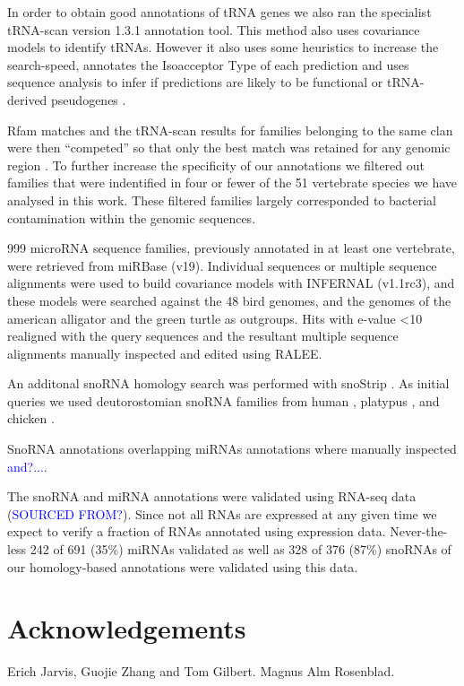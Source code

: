 \documentclass[10pt]{bmc_article}
\newcommand {\ppg}[1]{\textcolor{blue}{#1}}
\newenvironment{bmcformat}{\begin{raggedright}\baselineskip20pt\sloppy\setboolean{publ}{false}}{\end{raggedright}\baselineskip20pt\sloppy}
\begin{document}
\begin{bmcformat}
In order to obtain good annotations of tRNA genes we also ran the
specialist tRNA-scan version 1.3.1 annotation tool. This method also
uses covariance models to identify tRNAs. However it also uses some
heuristics to increase the search-speed, annotates the Isoacceptor
Type of each prediction and uses sequence analysis to infer if
predictions are likely to be functional or tRNA-derived pseudogenes
\cite{Lowe:1997,Chan:2009}.

Rfam matches and the tRNA-scan results for families belonging to the
same clan were then ``competed'' so that only the best match was
retained for any genomic region \cite{Gardner:2011a}.  To further
increase the specificity of our annotations we filtered out families
that were indentified in four or fewer of the 51 vertebrate species we
have analysed in this work. These filtered families largely
corresponded to bacterial contamination within the genomic sequences.

999 microRNA sequence families, previously annotated in at least one
vertebrate, were retrieved from miRBase (v19). Individual sequences or
multiple sequence alignments were used to build covariance models with
INFERNAL (v1.1rc3), and these models were searched against the 48 bird
genomes, and the genomes of the american alligator and the green
turtle as outgroups. Hits with e-value <10 realigned with the query
sequences and the resultant multiple sequence alignments manually
inspected and edited using RALEE.

An additonal snoRNA homology search was performed with snoStrip
\cite{Bartschat:2013}. As initial queries we used deutorostomian
snoRNA families from human \cite{Lestrade:2006}, platypus
\cite{Schmitz:2008}, and chicken \cite{Shao:2009}.

SnoRNA annotations overlapping miRNAs annotations where manually
inspected \ppg{and?...}.

The snoRNA and miRNA annotations were validated using RNA-seq data
(\ppg{SOURCED FROM?}). Since not all RNAs are expressed at any given
time we expect to verify a fraction of RNAs annotated using expression
data. Never-the-less 242 of 691 (35\%) miRNAs validated as well as 328
of 376 (87\%) snoRNAs of our homology-based annotations were validated
using this data.

\section*{Acknowledgements}

Erich Jarvis, Guojie Zhang and Tom Gilbert. Magnus Alm Rosenblad. 



\end{bmcformat}
\end{document}
